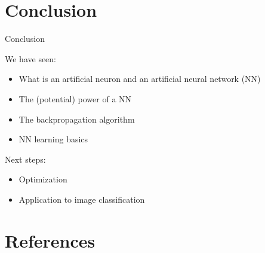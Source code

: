 \documentclass[xcolor=pdftex,dvipsnames,table,mathserif]{beamer}
\begin{document}


\section{Conclusion}


\begin{frame}{Conclusion}

  We have seen:
  \begin{itemize}
  \item What is an artificial neuron and an artificial neural network (NN)
  \item The (potential) power of a NN
  \item The backpropagation algorithm
  \item NN learning basics
  \end{itemize}

  Next steps:
  \begin{itemize}
    \item Optimization
    \item Application to image classification
  \end{itemize}


\end{frame}


\section*{References}



\end{document}
